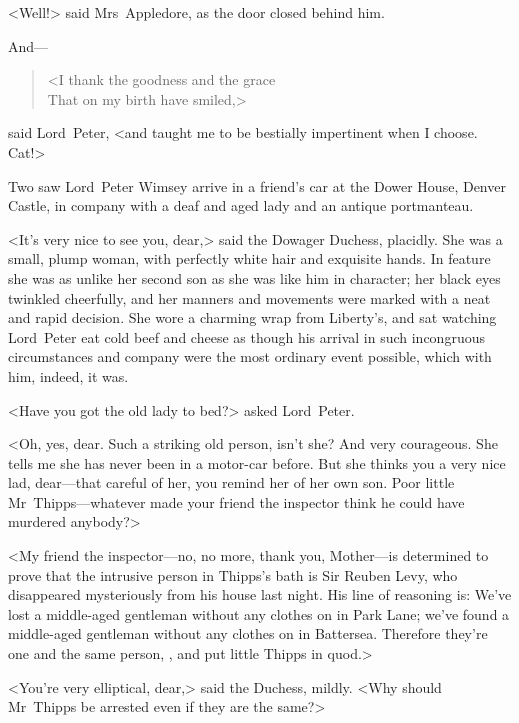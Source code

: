<Well!> said Mrs~Appledore, as the door closed behind him.

And—

\begin{verse}
<I thank the goodness and the grace\\
That on my birth have smiled,>
\end{verse}

said Lord~Peter, <and taught me to be bestially impertinent when I choose. Cat!>

Two  saw Lord~Peter Wimsey arrive in a friend's car at the Dower House, Denver Castle, in company with a deaf and aged lady and an antique portmanteau.

<It's very nice to see you, dear,> said the Dowager Duchess, placidly. She was a small, plump woman, with perfectly white hair and exquisite hands. In feature she was as unlike her second son as she was like him in character; her black eyes twinkled cheerfully, and her manners and movements were marked with a neat and rapid decision. She wore a charming wrap from Liberty's, and sat watching Lord~Peter eat cold beef and cheese as though his arrival in such incongruous circumstances and company were the most ordinary event possible, which with him, indeed, it was.

<Have you got the old lady to bed?> asked Lord~Peter.

<Oh, yes, dear. Such a striking old person, isn't she? And very courageous. She tells me she has never been in a motor-car before. But she thinks you a very nice lad, dear—that careful of her, you remind her of her own son. Poor little Mr~Thipps—whatever made your friend the inspector think he could have murdered anybody?>

<My friend the inspector—no, no more, thank you, Mother—is determined to prove that the intrusive person in Thipps's bath is Sir Reuben Levy, who disappeared mysteriously from his house last night. His line of reasoning is: We've lost a middle-aged gentleman without any clothes on in Park Lane; we've found a middle-aged gentleman without any clothes on in Battersea. Therefore they're one and the same person, , and put little Thipps in quod.>

<You're very elliptical, dear,> said the Duchess, mildly. <Why should Mr~Thipps be arrested even if they are the same?>

